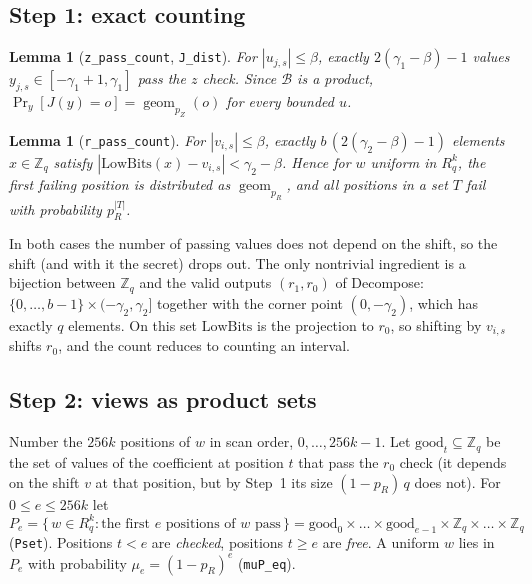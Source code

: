 \documentclass[11pt]{article}
\newtheorem{lemma}[theorem]{Lemma}
\theoremstyle{definition}
\theoremstyle{remark}
\newcommand{\Zq}{\mathbb{Z}_q}
\newcommand{\Rq}{R_q}
\newcommand{\geom}{\operatorname{geom}}
\newcommand{\lean}[1]{\texttt{#1}}
\renewcommand{\Pr}{\mathop{\mathrm{Pr}}}
\begin{document}
\subsection{Step 1: exact counting}

\begin{lemma}[\lean{z\_pass\_count}, \lean{J\_dist}]
For $|u_{j,s}|\le\beta$, exactly $2(\gamma_1-\beta)-1$ values $y_{j,s}\in[-\gamma_1+1,\gamma_1]$
pass the $z$ check. Since $\mathcal{B}$ is a product, $\Pr_y[J(y) = o] = \geom_{p_Z}(o)$ for every
bounded $u$.
\end{lemma}

\begin{lemma}[\lean{r\_pass\_count}]
For $|v_{i,s}|\le\beta$, exactly $b\,(2(\gamma_2-\beta)-1)$ elements $x\in\Zq$ satisfy
$|\mathrm{LowBits}(x)-v_{i,s}|<\gamma_2-\beta$. Hence for $w$ uniform in $\Rq^k$, the first
failing position is distributed as $\geom_{p_R}$, and all positions in a set $T$ fail with
probability $p_R^{|T|}$.
\end{lemma}

In both cases the number of passing values does not depend on the shift, so the shift (and with
it the secret) drops out. The only nontrivial ingredient is a bijection between $\Zq$ and the
valid outputs $(r_1,r_0)$ of Decompose: $\{0,\dots,b-1\}\times(-\gamma_2,\gamma_2]$ together with
the corner point $(0,-\gamma_2)$, which has exactly $q$ elements. On this set $\mathrm{LowBits}$
is the projection to $r_0$, so shifting by $v_{i,s}$ shifts $r_0$, and the count reduces to
counting an interval.

\subsection{Step 2: views as product sets}

Number the $256k$ positions of $w$ in scan order, $0,\dots,256k-1$. Let
$\mathrm{good}_t \subseteq \Zq$ be the set of values of the coefficient at position $t$ that
pass the $r_0$ check (it depends on the shift $v$ at that position, but by Step~1 its size
$(1-p_R)\,q$ does not). For $0\le e\le 256k$ let
\[
  P_e = \{\, w \in \Rq^k : \text{the first $e$ positions of $w$ pass}\,\}
      = \mathrm{good}_0\times\dots\times\mathrm{good}_{e-1}\times\Zq\times\dots\times\Zq
\]
(\lean{Pset}). Positions $t<e$ are \emph{checked}, positions $t\ge e$ are \emph{free}. A uniform
$w$ lies in $P_e$ with probability $\mu_e = (1-p_R)^e$ (\lean{muP\_eq}).
\end{document}
